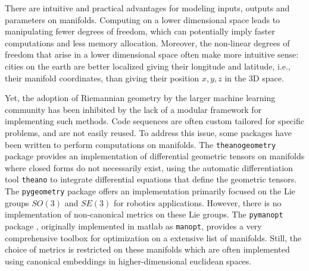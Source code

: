 \documentclass{article}
\begin{document}


There are intuitive and practical advantages for modeling inputs, outputs and parameters on manifolds. Computing on a lower dimensional space leads to manipulating fewer degrees of freedom, which can potentially imply faster computations and less memory allocation. Moreover, the non-linear degrees of freedom that arise in a lower dimensional space often make more intuitive sense: cities on the earth are better localized giving their longitude and latitude, i.e., their manifold coordinates, than giving their position $x, y, z$ in the 3D space.


Yet, the adoption of Riemannian geometry by the larger machine learning community has been inhibited by the lack of a modular framework for implementing such methods. Code sequences are often custom tailored for specific problems, and are not easily reused. To address this issue, some packages have been written to perform computations on manifolds. The \texttt{theanogeometry} package \cite{theanogeometry} provides an implementation of differential geometric tensors on manifolds where closed forms do not necessarily exist, using the automatic differentiation tool \texttt{theano} to integrate differential equations that define the geometric tensors. The \texttt{pygeometry} package \cite{pygeometry} offers an implementation primarily focused on the Lie groups $SO(3)$ and $SE(3)$ for robotics applications. However, there is no implementation of non-canonical metrics on these Lie groups. The \texttt{pymanopt} package \cite{pymanopt}, originally implemented in matlab as \texttt{manopt}, provides a very comprehensive toolbox for optimization on a extensive list of manifolds. Still, the choice of metrics is restricted on these manifolds which are often implemented using canonical embeddings in higher-dimensional euclidean spaces.
\end{document}
